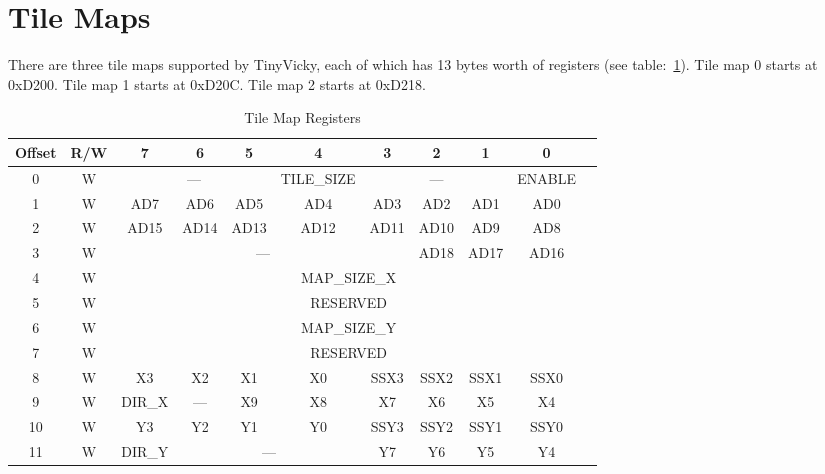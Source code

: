\section*{Tile Maps}

There are three tile maps supported by TinyVicky, each of which has 13 bytes worth of registers (see table:~\ref{tab:tilemap_reg}). Tile map 0 starts at 0xD200. Tile map 1 starts at 0xD20C. Tile map 2 starts at 0xD218.

\begin{table}[ht]
    \begin{center}
        \begin{tabular}{|c|c|c|c|c|c|c|c|c|c|c|} \hline
            Offset & R/W & 7 & 6 & 5 & 4 & 3 & 2 & 1 & 0 \\ \hline\hline
            0 & W & \multicolumn{3}{|c|}{---} & TILE\_SIZE & \multicolumn{3}{|c|}{---} & ENABLE \\ \hline
            1 & W & AD7 & AD6 & AD5 & AD4 & AD3 & AD2 & AD1 & AD0 \\ \hline
            2 & W & AD15 & AD14 & AD13 & AD12 & AD11 & AD10 & AD9 & AD8 \\ \hline
            3 & W & \multicolumn{5}{|c|}{---} & AD18 & AD17 & AD16 \\ \hline
            4 & W & \multicolumn{8}{|c|}{MAP\_SIZE\_X} \\ \hline
            5 & W & \multicolumn{8}{|c|}{RESERVED} \\ \hline
            6 & W & \multicolumn{8}{|c|}{MAP\_SIZE\_Y} \\ \hline
            7 & W & \multicolumn{8}{|c|}{RESERVED} \\ \hline
            8 & W & X3 & X2 & X1 & X0 & SSX3 & SSX2 & SSX1 & SSX0 \\ \hline
            9 & W & DIR\_X & --- & X9 & X8 & X7 & X6 & X5 & X4 \\ \hline
            10 & W & Y3 & Y2 & Y1 & Y0 & SSY3 & SSY2 & SSY1 & SSY0 \\ \hline
            11 & W & DIR\_Y &\multicolumn{3}{|c|}{---} & Y7 & Y6 & Y5 & Y4 \\ \hline
        \end{tabular}
    \end{center}
    \caption{Tile Map Registers}
    \label{tab:tilemap_reg}
\end{table}

